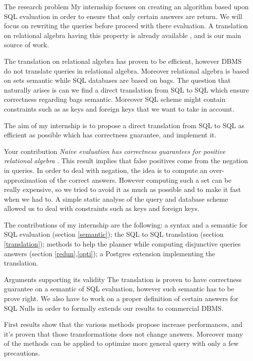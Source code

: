 \begin{point}{The research problem}
 My internship focuses on creating an algorithm based upon SQL evaluation in order to ensure that only certain answers are return. We will focus on rewriting the queries before proceed with there evaluation.
 A translation on relational algebra having this property is already available \cite{guagliardo2016making}, and is our main source of work.
 
 The translation on relational algebra has proven to be efficient, however DBMS do not translate queries in relational algebra. Moreover relational algebra is based on sets semantic while SQL databases are based on bags. The question that naturally arises is can we find a direct translation from SQL to SQL which ensure correctness regarding bags semantic. Moreover SQL scheme might contain constraints such as as keys and foreign keys that we want to take in account.
 
 The aim of my internship is to propose a direct translation from SQL to SQL as efficient as possible which has correctness guarantee, and implement it.  

\end{point}

\begin{point}{Your contribution}
\emph{Naive evaluation has correctness guarantees for positive relational algebra} \cite{gheerbrant2014naive}. This result implies that false positives come from the negation in queries. In order to deal with negation, the idea is to compute an over-approximation of the correct answers. However computing such a set can be really expensive, so we tried to avoid it as much as possible and to make it fast when we had to.
A simple static analyse of the query and database scheme allowed us to deal with constraints such as keys and foreign keys.

The contributions of my internship are the following: a syntax and a semantic for SQL evaluation (section \ref{semantic}); the SQL to SQL translation (section \ref{translation}); methods to help the planner while computing disjunctive queries answers (section \ref{redun},\ref{opti}); a Postgres extension implementing the translation. 
\end{point}

\begin{point}{Arguments supporting its validity}
  The translation is proven to have correctness guarantee on a semantic of SQL evaluation, however such semantic has to be prove right.  We also have to work on a proper definition of certain answers for SQL Nulls in order to formally extends our results to commercial DBMS.
  
  First results show that the various methods propose increase performances, and it's proven that those transformations does not change answers. Moreover many of the methods can be applied to optimize more general query with only a few precautions.
\end{point}


